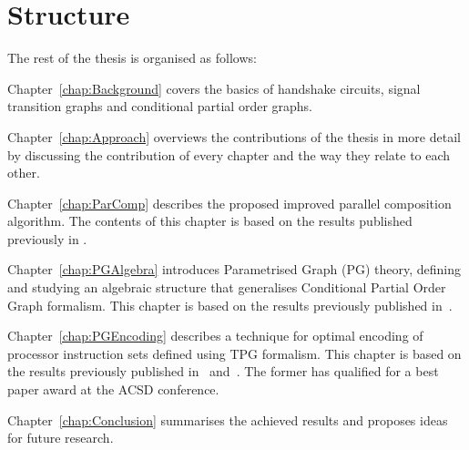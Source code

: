 \section{Structure}

The rest of the thesis is organised as follows:

Chapter~\ref{chap:Background} covers the basics of handshake circuits, signal transition graphs and conditional partial order graphs.

Chapter~\ref{chap:Approach} overviews the contributions of the thesis in more detail by discussing the contribution of every chapter and the way they relate to each other.

Chapter~\ref{chap:ParComp} describes the proposed improved parallel composition algorithm. The contents of this chapter is based on the results published previously in \cite{improved_par_comp}.

Chapter~\ref{chap:PGAlgebra} introduces Parametrised Graph (PG) theory, defining and studying an algebraic structure that generalises Conditional Partial Order Graph formalism. This chapter is based on the results previously published in~\cite{pg_algebra}.

Chapter~\ref{chap:PGEncoding} describes a technique for optimal encoding of processor instruction sets defined using TPG formalism. This chapter is based on the results previously published in~\cite{cpog_encoding_best_paper} and~\cite{cpog_encoding}. The former has qualified for a best paper award at the ACSD conference.

Chapter~\ref{chap:Conclusion} summarises the achieved results and proposes ideas for future research.
